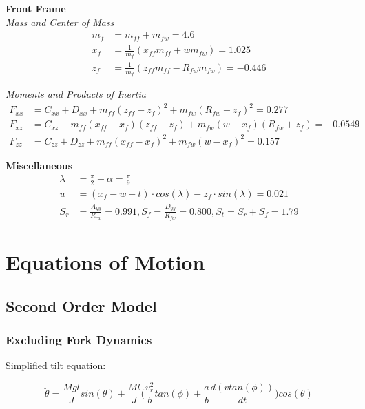 \documentclass[a4paper]{article}
\begin{document}
\noindent \textbf{Front Frame} \\

\noindent \textit{Mass and Center of Mass}
\begin{align}
m_f &= m_{ff} + m_{fw} = 4.6 \\
x_f &= \frac{1}{m_f} (x_{ff} m_{ff} + w m_{fw}) = 1.025 \\
z_f &= \frac{1}{m_f} (z_{ff} m_{ff} - R_{fw} m_{fw}) = -0.446
\end{align}

\noindent \textit{Moments and Products of Inertia}
\begin{align}
F_{xx} &= C_{xx} + D_{xx} + m_{ff} (z_{ff} - z_f)^2 + m_{fw} (R_{fw} + z_f)^2 = 0.277 \\
F_{xz} &= C_{xz} - m_{ff} (x_{ff} - x_f) (z_{ff} - z_f) + m_{fw} (w - x_f) (R_{fw} + z_f) = -0.0549 \\
F_{zz} &= C_{zz} + D_{zz} + m_{ff} (x_{ff} - x_f)^2 + m_{fw} (w - x_f)^2 = 0.157
\end{align}

\noindent \textbf{Miscellaneous} \\
\begin{align}
\lambda &= \frac{\pi}{2} - \alpha = \frac{\pi}{9}\\
u &= (x_f - w - t) \cdot cos(\lambda) - z_f \cdot sin(\lambda) = 0.021 \\
S_r &= \frac{A_{yy}}{R_{rw}} = 0.991, S_f = \frac{D_{yy}}{R_{fw}} = 0.800, S_t = S_r + S_f = 1.79
\end{align}

\section{Equations of Motion}

\subsection{Second Order Model}

\subsubsection{Excluding Fork Dynamics}

Simplified tilt equation:

\begin{equation}
\ddot{\theta} = \frac{Mgl}{J} sin(\theta) + \frac{Ml}{J} \Big( \frac{v^2_r}{b} tan(\phi) + \frac{a}{b} \frac{d(v tan(\phi))}{dt} \Big) cos(\theta)
\end{equation}
\end{document}
